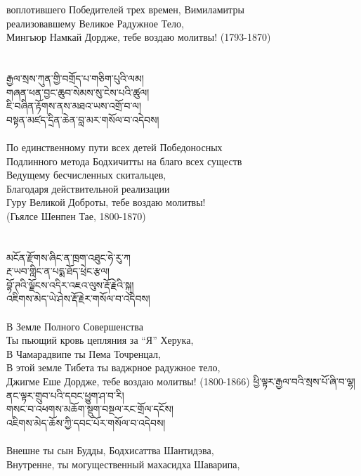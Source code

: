 воплотившего Победителей трех времен, Вимиламитры\\
реализовавшему Великое Радужное Тело,\\
Мингьюр Намкай Дордже, тебе воздаю молитвы! (1793-1870)\\
\\
\\
\ti
རྒྱལ་སྲས་ཀུན་གྱི་བགྲོད་པ་གཅིག་པུའི་ལམ། \\
གཞན་ཕན་བྱང་ཆུབ་སེམས་སུ་ངེས་པའི་ཚུལ། \\
ཇི་བཞིན་རྟོགས་ནས་མཐའ་ཡས་འགྲོ་བ་ལ། \\
བསྟན་མཛད་དྲིན་ཆེན་བླ་མར་གསོལ་བ་འདེབས།\\
\\
\ru
По единственному пути всех детей Победоносных\\
Подлинного метода Бодхичитты на благо всех существ\\
Ведущему бесчисленных скитальцев,\\
Благодаря действительной реализации \\
Гуру Великой Доброты, тебе воздаю молитвы!\\
\hspace{2cm}(Гьялсе Шенпен Тае, 1800-1870)\\
\\
\\
\ti
མངོན་རྫོགས་ཞིང་ན་ཁྲག་འཐུང་ཧེ་རུ་ཀ \\
རྔ་ཡབ་གླིང་ན་པདྨ་ཐོད་ཕྲེང་རྩལ། \\
བྷོ་ཊའི་ལྗོངས་འདིར་འཇའ་ལུས་རྡོ་རྗེའི་སྐུ། \\
འཇིགས་མེད་ཡེ་ཤེས་རྡོ་རྗེར་གསོལ་བ་འདེབས།\\
\\
\ru
В Земле Полного Совершенства\\
Ты пьющий кровь цепляния за “Я” Херука,\\
В Чамарадвипе ты Пема Точренцал,\\
В этой земле Тибета ты ваджрное радужное тело,\\
Джигме Еше Дордже, тебе воздаю молитвы! (1800-1866)
\newpage
\ti
ཕྱི་ལྟར་རྒྱལ་བའི་སྲས་པོ་ཞི་བ་ལྷ། \\
ནང་ལྟར་གྲུབ་པའི་དབང་ཕྱུག་ཤ་བ་རི། \\
གསང་བ་འཕགས་མཆོག་སྡུག་བསྔལ་རང་གྲོལ་དངོས། \\
འཇིགས་མེད་ཆོས་ཀྱི་དབང་པོར་གསོལ་བ་འདེབས།\\
\\
\ru
Внешне ты сын Будды, Бодхисаттва Шантидэва,\\
Внутренне, ты могущественный махасидха Шаварипа,\\
